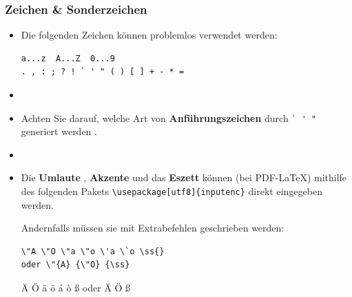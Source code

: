 \begin{frame}[fragile]
\frametitle{Zeichen \& Sonderzeichen}

\begin{itemize}
\item Die folgenden Zeichen können problemlos verwendet werden:\\ 

\begin{lstlisting}
a...z  A...Z  0...9
. , : ; ? ! ` ' " ( ) [ ] + - * =
\end{lstlisting}

\item[]

\item Achten Sie darauf, welche Art von \textbf{Anführungszeichen} durch \lstinline|` ' "|  generiert werden \citep[vgl.][]{MyP17c}. 

\item[]

\item Die \textbf{Umlaute} , \textbf{Akzente}  und das \textbf{Eszett}  können (bei PDF-\LaTeX ) mithilfe des folgenden Pakets \lstinline|\usepackage[utf8]{inputenc}| direkt eingegeben werden.

Andernfalls müssen sie mit Extrabefehlen geschrieben werden:


\begin{lstlisting}
\"A \"O \"a \"o \'a \`o \ss{} 
oder \"{A} {\"O} {\ss} 
\end{lstlisting}

\ea \"A \"O \"a \"o \'a \`o \ss{} oder \"{A} {\"O} {\ss} 
\z 

\end{itemize}

\end{frame}


